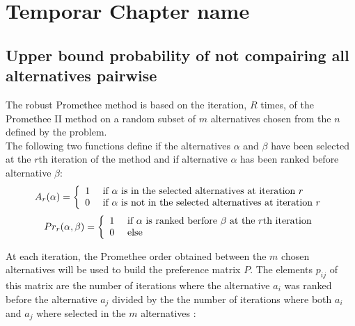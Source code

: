 %

\chapter{Temporar Chapter name}
\label{chapter1}

\section{Upper bound probability of not compairing all alternatives pairwise}
The robust Promethee method is based on the iteration, $R$ times, of the Promethee II method on a random subset of $m$ alternatives chosen from the $n$ defined by the problem.\\

The following two functions define if the alternatives $\alpha$ and $\beta$ have been selected at the $r$th iteration of the method and if alternative $\alpha$ has been ranked before alternative $\beta$: \\

\begin{equation}
  \label{eqn:ar}
  A_{r}(\alpha ) = \left\{ 
    \begin{array}{l l}
      1 & \ \text{if $\alpha$ is in the selected alternatives at iteration $r$}\\
      0 & \ \text{if $\alpha$ is not in the selected alternatives at iteration $r$}\\
    \end{array} \right . 
\end{equation}
\begin{equation}
  \label{eqn:prr}
  Pr_{r}( \alpha , \beta) = \left\{ 
    \begin{array}{l l}
      1 & \ \text{if $\alpha$ is ranked berfore $\beta$ at the $r$th iteration}\\
      0 & \ \text{else}\\
    \end{array} \right . 
\end{equation}

At each iteration, the Promethee order obtained between the $m$ chosen alternatives will be used to build the preference matrix $P$. The elements $p_{ij}$ of this matrix are the number of iterations where the alternative $a_i$ was ranked before the alternative $a_j$ divided by the the number of iterations where both $a_i$ and $a_j$ where selected in the $m$ alternatives :

